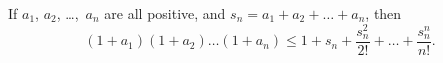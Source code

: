 If $a_{1}$, $a_{2}$, \dots,~$a_{n}$ are all positive, and $s_{n} = a_{1} + a_{2} + \dots + a_{n}$, then
\[
(1 + a_{1})(1 + a_{2}) \dots (1 + a_{n})
  \leq 1 + s_{n} + \frac{s_{n}^{2}}{2!} + \dots + \frac{s_{n}^{n}}{n!}.
\]
